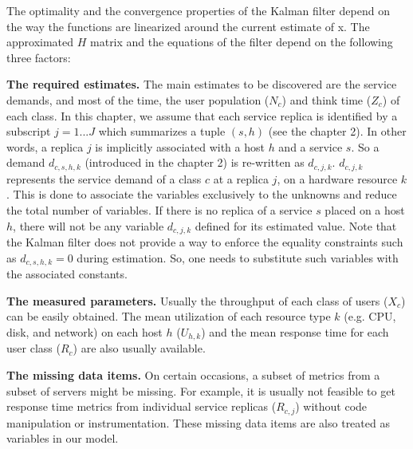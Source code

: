  The optimality and the convergence properties of the Kalman filter depend on the way the functions are linearized around the current estimate of x.   
		The approximated $H$ matrix and the equations of the filter depend on the following three factors: 


  \textbf{The required estimates.} 
  The main estimates to be discovered are the service demands, and most of the time, the user population ($N_c$) and think time ($Z_c$) of each class. In this chapter, we assume that each service replica is identified by a subscript $j=1...J$ which summarizes a tuple $(s,h)$  (see the chapter 2). In other words, a replica $j$ is implicitly associated with a host $h$ and a service $s$. So a demand $d_{c,s,h,k}$ (introduced in the chapter 2) is re-written as $d_{c,j,k}$.  $d_{c,j,k}$ represents the service demand of a class $c$ at a replica $j$, on a hardware resource $k$. This is done to associate the variables exclusively to the unknowns and reduce the total number of variables. If there is no replica of a service $s$ placed on a host $h$, there will not be any variable $d_{c,j,k}$ defined for its estimated value. Note that the Kalman filter does not provide a way to enforce the equality constraints such as $d_{c,s,h,k}=0$ during estimation. So, one needs to substitute such variables with the associated constants.   

  \textbf{The measured parameters.}
     Usually the throughput of each class of users ($X_c$) can be easily obtained. The mean utilization of each resource type $k$ (e.g. CPU, disk, and network) on each host $h$ ($U_{h,k}$) and the mean response time for each user class ($R_{c}$) are also usually available. %

     \textbf{The missing data items.} On certain occasions, a subset of metrics from a subset of servers might be missing. For example, it is usually not feasible to get response time metrics from individual service replicas ($R_{c,j}$) without code manipulation or instrumentation. These missing data items are also treated as variables in our model.  


